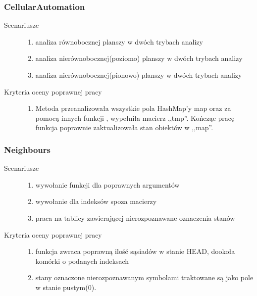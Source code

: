 \documentclass[a4paper,11pt]{article}
\begin{document}
\subsubsection{CellularAutomation}
\begin{description}

\item[Scenariusze] \hfill
\begin{enumerate}
\item analiza równobocznej planszy w dwóch trybach analizy
\item analiza nierównobocznej(poziomo)  planszy w dwóch trybach analizy
\item analiza nierównobocznej(pionowo) planszy w dwóch trybach analizy
\end{enumerate}

\item[Kryteria oceny poprawnej pracy] \hfill
\begin{enumerate}
\item Metoda przeanalizowała wszystkie pola HashMap'y map oraz za pomocą innych funkcji , wypełniła macierz ,,tmp''. Kończąc pracę funkcja poprawnie zaktualizowała stan obiektów w ,,map''.

\end{enumerate}

\end{description}

\subsubsection{Neighbours}
\begin{description}

\item[Scenariusze] \hfill
\begin{enumerate}
\item wywołanie funkcji dla poprawnych argumentów
\item wywołanie dla indeksów spoza macierzy
\item praca na tablicy zawierającej nierozpoznawane oznaczenia stanów

\end{enumerate}

\item[Kryteria oceny poprawnej pracy] \hfill
\begin{enumerate}
\item funkcja zwraca poprawną ilość sąsiadów w stanie HEAD, dookoła komórki o podanych indeksach
\item stany oznaczone nierozpoznawanym symbolami traktowane są jako pole w stanie pustym(0).

\end{enumerate}

\end{description}
\end{document}
